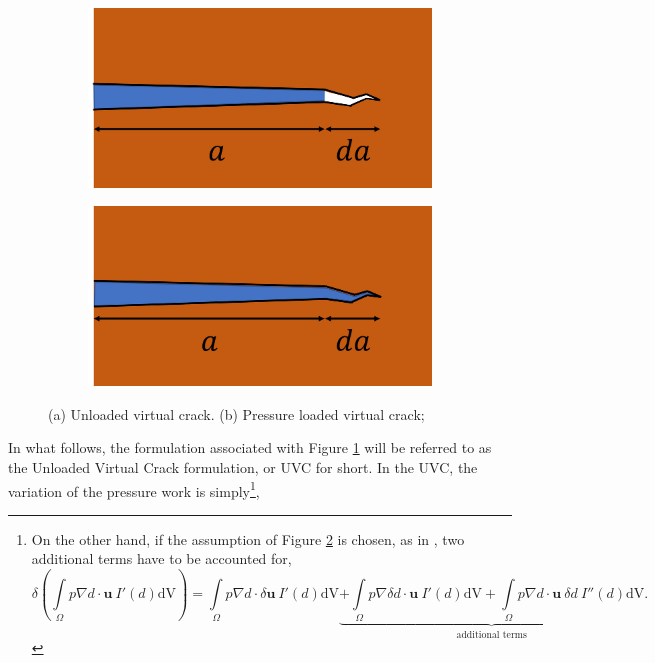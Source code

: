 \begin{figure}[h]
\bigskip
\begin{subfigure}{.49\textwidth}
  \centering
  \includegraphics[width=0.9\linewidth]{images/theory_part/dry_crack.png}
  \caption{}
  \label{fig:dry_crack}
\end{subfigure}%
\begin{subfigure}{.49\textwidth}
  \centering
  \includegraphics[width=0.9\linewidth]{images/theory_part/wet_crack.png}
  \caption{}
  \label{fig:wet_crack}
\end{subfigure}%
  \caption{(a) Unloaded virtual crack. (b) Pressure loaded virtual crack;} 
  \label{fig:wet_vs_dry_crack}
\end{figure}

In what follows, the formulation associated with Figure \ref{fig:dry_crack} will be referred to as the Unloaded Virtual Crack formulation, or UVC for short. In the UVC, the variation of the pressure work is simply\footnote{\noindent On the other hand, if the assumption of Figure \ref{fig:wet_crack} is chosen, as in \cite{bourdin2012variational}, two additional terms have to be accounted for, \begin{equation*}\label{wet variation}
    \delta \left( \int\limits_{\Omega} p \nabla d\cdot\textbf{u}\ I'(d)\text{dV} \right) = \int\limits_{\Omega} p \nabla d\cdot\delta\textbf{u}\ I'(d)\text{dV} \underbrace{+ \int\limits_{\Omega} p \nabla \delta d\cdot\textbf{u}\ I'(d)\text{dV} + \int\limits_{\Omega} p \nabla d\cdot\textbf{u}\ \delta d\ I''(d)\text{dV}}_{\text{additional terms}}.
\end{equation*}},

